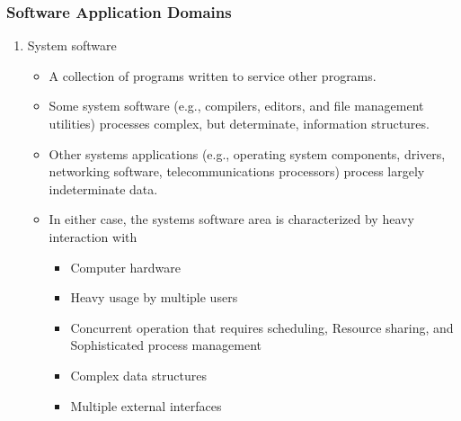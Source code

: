 \documentclass{article}
\begin{document}
	\subsubsection{Software Application Domains}
	\begin{enumerate}[label=\arabic*)]
		\item System software
			\begin{itemize}
				\item A collection of programs written to service other programs.
				\item Some system software (e.g., compilers, editors, and file management utilities) processes
					complex, but determinate, information structures.
				\item Other systems applications (e.g., operating system components, drivers, networking
					software, telecommunications processors) process largely indeterminate data.
				\item In either case, the systems software area is characterized by heavy interaction with
					\begin{itemize}
						\item Computer hardware
						\item Heavy usage by multiple users
						\item Concurrent operation that requires scheduling, Resource sharing, and
							Sophisticated process management
						\item Complex data structures
						\item Multiple external interfaces
				\end{itemize}
			\end{itemize}


\end{enumerate}
\end{document}
